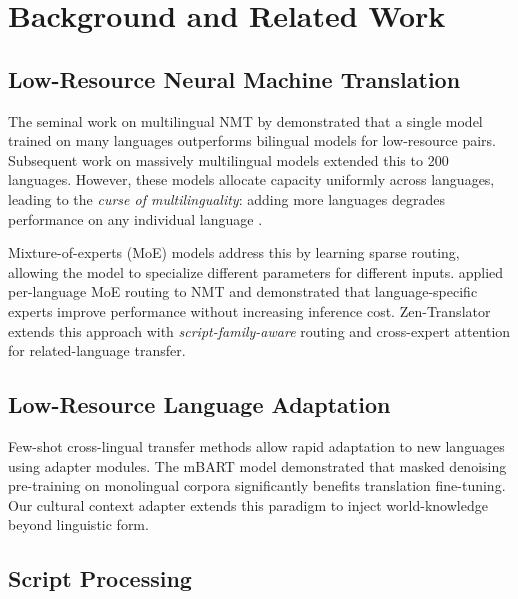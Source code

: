 \documentclass[11pt,twocolumn]{article}
\begin{document}
\section{Background and Related Work}

\subsection{Low-Resource Neural Machine Translation}

The seminal work on multilingual NMT by \citet{johnson2017google} demonstrated
that a single model trained on many languages outperforms bilingual models for
low-resource pairs. Subsequent work on massively multilingual models
\citep{fan2021beyond, tang2021multilingual} extended this to 200 languages.
However, these models allocate capacity uniformly across languages, leading to
the \textit{curse of multilinguality}: adding more languages degrades performance
on any individual language \citep{conneau2020unsupervised}.

Mixture-of-experts (MoE) models \citep{shazeer2017outrageously} address this by
learning sparse routing, allowing the model to specialize different parameters
for different inputs. \citet{kudugunta2021beyond} applied per-language MoE
routing to NMT and demonstrated that language-specific experts improve
performance without increasing inference cost. Zen-Translator extends this
approach with \emph{script-family-aware} routing and cross-expert attention
for related-language transfer.

\subsection{Low-Resource Language Adaptation}

Few-shot cross-lingual transfer methods \citep{wu2020emerging, pfeiffer2020adapterhub}
allow rapid adaptation to new languages using adapter modules. The mBART model
\citep{liu2020multilingual} demonstrated that masked denoising pre-training on
monolingual corpora significantly benefits translation fine-tuning. Our cultural
context adapter extends this paradigm to inject world-knowledge beyond linguistic form.

\subsection{Script Processing}
\end{document}
